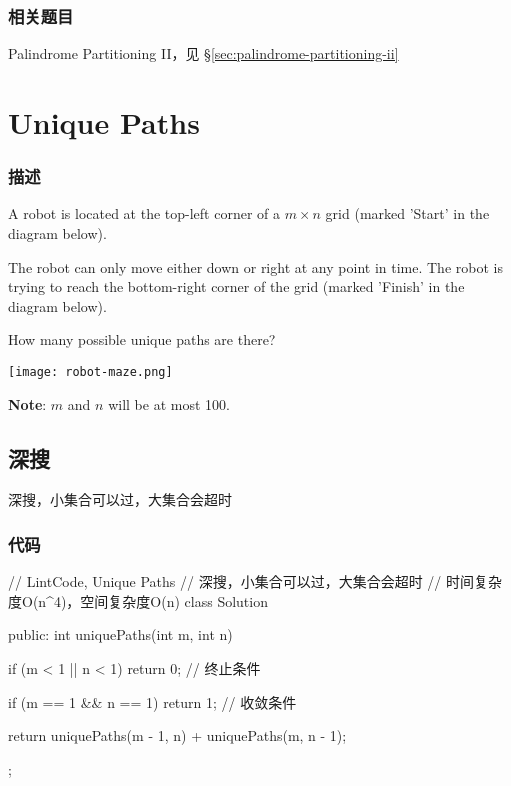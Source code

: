 \subsubsection{相关题目}

\begindot
\item Palindrome Partitioning II，见 \S \ref{sec:palindrome-partitioning-ii}
\myenddot


\section{Unique Paths} %
\label{sec:unique-paths}


\subsubsection{描述}
A robot is located at the top-left corner of a $m \times n$ grid (marked 'Start' in the diagram below).

The robot can only move either down or right at any point in time. The robot is trying to reach the bottom-right corner of the grid (marked 'Finish' in the diagram below).

How many possible unique paths are there?

\begin{center}
\texttt{[image: robot-maze.png]}\\
\label{fig:unique-paths}
\end{center}

\textbf{Note}: $m$ and $n$ will be at most 100.


\subsection{深搜}
深搜，小集合可以过，大集合会超时

\subsubsection{代码}
\begin{Code}
// LintCode, Unique Paths
// 深搜，小集合可以过，大集合会超时
// 时间复杂度O(n^4)，空间复杂度O(n)
class Solution {
public:
    int uniquePaths(int m, int n) {
        if (m < 1 || n < 1) return 0; // 终止条件

        if (m == 1 && n == 1) return 1; // 收敛条件

        return uniquePaths(m - 1, n) + uniquePaths(m, n - 1);
    }
};
\end{Code}


